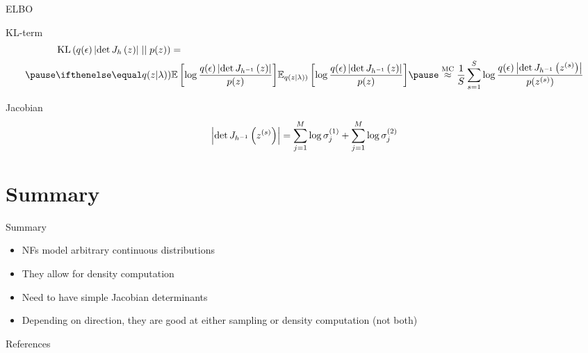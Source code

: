 \documentclass[14pt]{beamer}
\begin{document}
\begin{frame}{ELBO}
\begin{small}
\begin{block}{KL-term}
\begin{equation*}
\begin{aligned}
&\KL{q(\epsilon)\djac{h}{z}}{p(z)} = \\ \pause
&\E[q(z|\lambda))]{\log\frac{q(\epsilon)\djac{h^{-1}}{z}}{p(z)}} \pause \overset{\text{MC}}{\approx} \frac{1}{S}\sum_{s=1}^{S} \log\frac{q(\epsilon)\djac{h^{-1}}{z^{(s)}}}{p(z^{(s)})}
\end{aligned}
\end{equation*}
\end{block}
\pause
\begin{block}{Jacobian}
\pause
\begin{equation*}
\left|\det J_{h^{-1}}\left(z^{(s)}\right)\right| = \sum_{j=1}^{M}\log\sigma^{(1)}_{j} + \sum_{j=1}^{M}\log\sigma^{(2)}_{j}
\end{equation*}
\end{block}
\end{small}
\end{frame}


\section{Summary}

\begin{frame}{Summary}
\begin{itemize}
\item NFs model arbitrary continuous distributions
\item They allow for density computation
\item Need to have simple Jacobian determinants
\item Depending on direction, they are good at either sampling or density computation (not both)
\end{itemize}
\end{frame}

\begin{frame}[allowframebreaks]{References}


\nocite{KingmaEtAl:2016, RezendeMohamed:2015, HuangEtAl:2018}
\end{frame}
\end{document}

